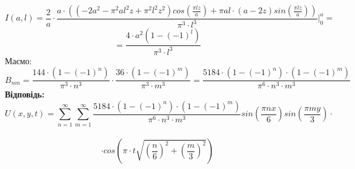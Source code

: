 \documentclass[]{article}
\begin{document}
\[I(a,l) = \frac{2}{a}\cdot \frac{a\cdot\left(\left(-2a^2-\pi^2al^2z+\pi^2l^2z^2\right)cos\left(\frac{\pi l z}{a}\right)+\pi a l\cdot(a-2z)sin\left(\frac{\pi l z}{a}\right)\right)}{\pi^3\cdot l^3}\bigg|_{0}^{a} = \]
\[=\frac{4\cdot a^2\left(1-(-1)^l\right)}{\pi^3\cdot l^3}\]
Маємо:
\[B_{nm} = \frac{144\cdot\left(1-(-1)^n\right)}{\pi^3\cdot n^3}\cdot\frac{36\cdot\left(1-(-1)^m\right)}{\pi^3\cdot m^3} = \frac{5184\cdot\left(1-(-1)^n\right)\cdot\left(1-(-1)^m\right)}{\pi^6\cdot n^3\cdot m^3}\]
\textbf{Відповідь:}
\[U(x,y,t) = \sum_{n=1}^{\infty}\sum_{m=1}^{\infty}\frac{5184\cdot\left(1-(-1)^n\right)\cdot\left(1-(-1)^m\right)}{\pi^6\cdot n^3\cdot m^3}sin\left(\frac{\pi n x}{6}\right)sin\left(\frac{\pi m y}{3}\right)\cdot\]\
\[\cdot cos\left(\pi\cdot t\sqrt{\left(\frac{n}{6}\right)^2+\left(\frac{m}{3}\right)^2}\right)\]
\end{document}
